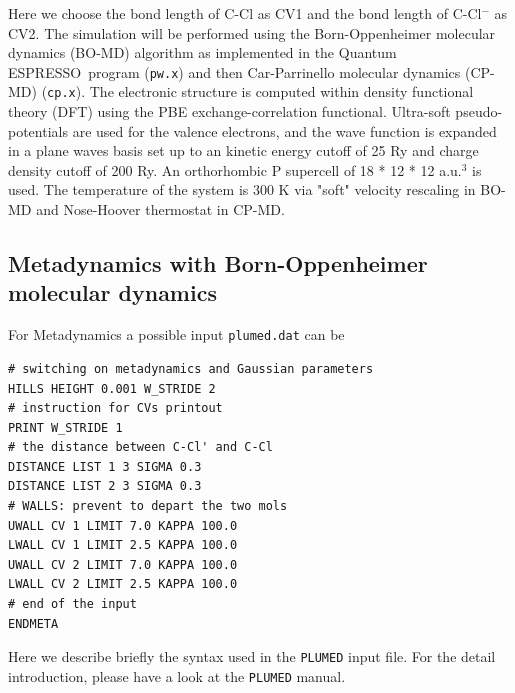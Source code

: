 \documentclass[12pt,a4paper]{article}
\def\qe{{\sc Quantum ESPRESSO}}
\begin{document}
Here we choose the bond length of C-Cl as CV1 and the bond length of C-Cl$^{-}$ as CV2. The simulation will be performed using the Born-Oppenheimer molecular dynamics (BO-MD) algorithm as implemented in the \qe\ program (\texttt{pw.x}) and then Car-Parrinello molecular dynamics (CP-MD) (\texttt{cp.x}). The electronic structure is computed within density functional theory (DFT) using the PBE exchange-correlation functional. Ultra-soft pseudo-potentials are used for the valence electrons, and the wave function is expanded in a plane waves basis set up to an kinetic energy cutoff of 25 Ry and charge density cutoff of 200 Ry. An orthorhombic P supercell of 18 * 12 * 12 a.u.$^{3}$ is used. The temperature of the system is 300 K via "soft" velocity rescaling in BO-MD and Nose-Hoover thermostat in CP-MD.

\subsection{Metadynamics with Born-Oppenheimer molecular dynamics}

For Metadynamics a possible input \texttt{plumed.dat} can be

\begin{verbatim}
# switching on metadynamics and Gaussian parameters
HILLS HEIGHT 0.001 W_STRIDE 2
# instruction for CVs printout
PRINT W_STRIDE 1
# the distance between C-Cl' and C-Cl
DISTANCE LIST 1 3 SIGMA 0.3
DISTANCE LIST 2 3 SIGMA 0.3
# WALLS: prevent to depart the two mols
UWALL CV 1 LIMIT 7.0 KAPPA 100.0
LWALL CV 1 LIMIT 2.5 KAPPA 100.0
UWALL CV 2 LIMIT 7.0 KAPPA 100.0
LWALL CV 2 LIMIT 2.5 KAPPA 100.0
# end of the input
ENDMETA
\end{verbatim}

Here we describe briefly the syntax used in the \texttt{PLUMED} input file. For the detail introduction, please have a look at the \texttt{PLUMED} manual\cite{PLUMED:manual}.
\end{document}
